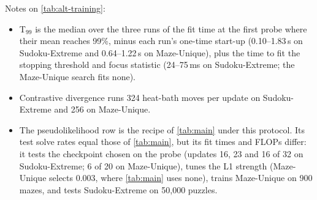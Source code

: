 \documentclass{article}
\begin{document}
%
%
Notes on \cref{tab:alt-training}:
\begin{itemize}
\item T$_{99}$ is the median over the three runs of the fit time at the first probe where their mean reaches 99\%, minus each run's one-time start-up (0.10--1.83\,s on Sudoku-Extreme and 0.64--1.22\,s on Maze-Unique), plus the time to fit the stopping threshold and focus statistic (24--75\,ms on Sudoku-Extreme; the Maze-Unique search fits none).
\item Contrastive divergence runs 324 heat-bath moves per update on Sudoku-Extreme and 256 on Maze-Unique.
\item The pseudolikelihood row is the recipe of \cref{tab:main} under this protocol. Its test solve rates equal those of \cref{tab:main}, but its fit times and FLOPs differ: it tests the checkpoint chosen on the probe (updates 16, 23 and 16 of 32 on Sudoku-Extreme; 6 of 20 on Maze-Unique), tunes the L1 strength (Maze-Unique selects 0.003, where \cref{tab:main} uses none), trains Maze-Unique on 900 mazes, and tests Sudoku-Extreme on 50,000 puzzles.
\end{itemize}
 
\end{document}
